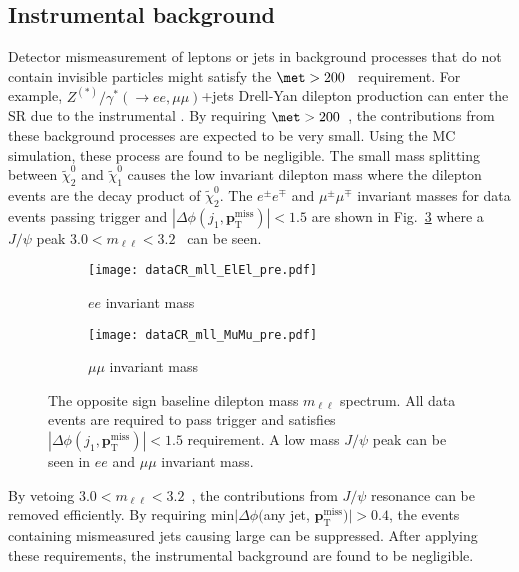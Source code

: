 \subsection{Instrumental \met background}
\label{subsec:bkg_instrumental_met_background}
Detector mismeasurement of leptons or jets in background processes that do not contain invisible particles might satisfy the $\met > 200$~{\GeV} requirement.
For example, $Z^{(*)}/\gamma^{*}(\to ee, \mu \mu)$+jets Drell-Yan dilepton production can enter the SR due to the instrumental \met.
By requiring $\met > 200$~{\GeV}, the contributions from these background processes are expected to be very small.
Using the MC simulation, these process are found to be negligible.
The small mass splitting between $\widetilde{\chi}^{0}_{2}$ and $\widetilde{\chi}^{0}_{1}$ causes the low invariant dilepton mass where the dilepton events are the decay product of $\widetilde{\chi}^{0}_{2}$.
The $e^{\pm} e^{\mp}$ and $\mu^{\pm} \mu^{\mp}$ invariant masses for data events passing \met trigger and $|\Delta \phi(j_{1}, \mathbf{p}_\mathrm{T}^\mathrm{miss})| < 1.5$ are shown in Fig.~\ref{fig:bkg_invariant_mass} where a $J/\psi$ peak $3.0 < m_{\ell \ell} < 3.2$~{\GeV} can be seen.

\begin{figure}[ht]
    \begin{center}
        \begin{subfigure}[b]{0.48\textwidth}
            \texttt{[image: dataCR\_mll\_ElEl\_pre.pdf]}
            \caption{$ee$ invariant mass}
            \label{fig:bkg_ee_invariant_mass}
        \end{subfigure}
        \begin{subfigure}[b]{0.48\textwidth}
            \texttt{[image: dataCR\_mll\_MuMu\_pre.pdf]}
            \caption{$\mu \mu$ invariant mass}
            \label{fig:bkg_mumu_invariant_mass}
        \end{subfigure}
        \caption{The opposite sign baseline dilepton mass $m_{\ell \ell}$ spectrum.
        All data events are required to pass \met trigger and satisfies $|\Delta \phi(j_{1}, \mathbf{p}_\mathrm{T}^\mathrm{miss})| < 1.5$ requirement.
        A low mass $J/\psi$ peak can be seen in $ee$ and $\mu \mu$ invariant mass.}
        \label{fig:bkg_invariant_mass}
    \end{center}
\end{figure}

By vetoing $3.0 < m_{\ell \ell} < 3.2$~{\GeV}, the contributions from $J/\psi$ resonance can be removed efficiently.
By requiring min$|\Delta \phi($any jet, $\mathbf{p}^{\mathrm{miss}}_{\mathrm{T}})| > 0.4$, the events containing mismeasured jets causing large \met can be suppressed.
After applying these requirements, the instrumental \met background are found to be negligible.

